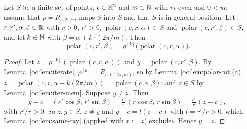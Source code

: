 \begin{lemma}\label{oc:lem:phase-nat}
Let $S$ be a finite set of points, $c\in\mathbb R^2$ and $m\in\mathbb N$ with $m$ even and $0<m$; assume that
$\rho=R_{c,2\pi/m}$ maps $S$ into $S$ and that $S$ is in general position. Let $r,r',\alpha,\beta\in\mathbb R$
with $r>0$, $r'>0$, $\operatorname{polar}(c,r,\alpha)\in S$ and $\operatorname{polar}(c,r',\beta)\in S$,
and let $k\in\mathbb N$ with $\beta=\alpha+k\cdot(2\pi/m)$. Then
\[\operatorname{polar}(c,r',\beta)=\rho^{[k]}\bigl(\operatorname{polar}(c,r,\alpha)\bigr).\]
\end{lemma}
\begin{proof}
Let $z=\rho^{[k]}(\operatorname{polar}(c,r,\alpha))$ and $y=\operatorname{polar}(c,r',\beta)$. By
Lemma~\ref{oc:lem:iterate}, $\rho^{[k]}=R_{c,k(2\pi/m)}$, so by Lemma~\ref{oc:lem:polar-rot}(a),
$z=\operatorname{polar}(c,r,\alpha+k(2\pi/m))=\operatorname{polar}(c,r,\beta)$; and $z\in S$ by
Lemma~\ref{oc:lem:iter-mem}. Suppose $y\ne z$. Then
\[y-c=(r'\cos\beta,\,r'\sin\beta)=\tfrac{r'}{r}\,(r\cos\beta,\,r\sin\beta)=\tfrac{r'}{r}\,(z-c),\]
with $r'/r>0$. So $z,y\in S$, $z\ne y$ and $y-c=l(z-c)$ with $l=r'/r>0$, which
Lemma~\ref{oc:lem:same-ray} (applied with $x:=z$) excludes. Hence $y=z$.
\end{proof}

